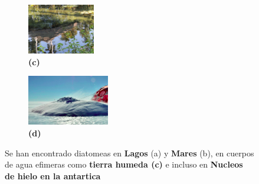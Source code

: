 \documentclass[10pt,aspectratio=1610,compress,dvipsnames]{beamer}
\begin{document}
\begin{frame}
{\begin{figure}
      \vspace{\baselineskip}

      \begin{subfigure}[b]{0.22\textwidth}
        \includegraphics[width=\textwidth, height=2.2cm]{lodo.jpeg}
        \caption*{\textbf{(c)}} %
        \label{fig:sub3}
      \end{subfigure}\hspace{0.5cm}
      \begin{subfigure}[b]{0.22\textwidth}
        \includegraphics[width=\textwidth, height=2.2cm]{ice.png}
        \caption*{\textbf{(d)}} %
        \label{fig:sub4}
      \end{subfigure}
      \caption{Se han encontrado diatomeas en \textbf{Lagos} (a) y \textbf{Mares} (b), en cuerpos de agua efimeras como \textbf{tierra humeda (c)} e incluso en \textbf{Nucleos de hielo en la antartica}}
      \label{fig:cuatro_subfiguras}
    \end{figure}
  }

\end{frame}
\end{document}
